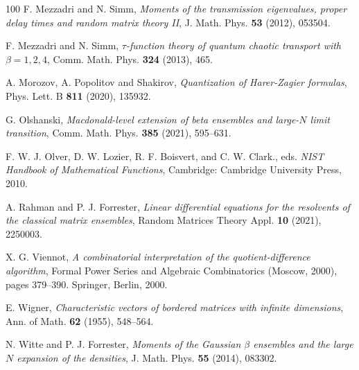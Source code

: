 \documentclass{amsart}
\theoremstyle{plain}
\theoremstyle{remark}
\numberwithin{equation}{section}
\begin{document}
\begin{thebibliography}{100}
 F. Mezzadri and N. Simm, \emph{Moments of the transmission eigenvalues, proper delay times and random matrix theory II}, J. Math. Phys. \textbf{53} (2012), 053504.
 
 F. Mezzadri and N. Simm, \emph{$\tau$-function theory of quantum chaotic transport with $\beta = 1, 2, 4$}, Comm. Math. Phys. \textbf{324} (2013), 465.
 
 A. Morozov, A. Popolitov and Shakirov, \emph{Quantization of Harer-Zagier formulas}, Phys. Lett. B \textbf{811} (2020), 135932. 
 

 G. Olshanski, \emph{Macdonald-level extension of beta ensembles and large-$N$ limit transition}, Comm. Math. Phys. \textbf{385} (2021), 595--631. 

  F. W. J. Olver, D. W. Lozier, R. F. Boisvert, and C. W. Clark., eds. \emph{NIST Handbook of Mathematical Functions}, Cambridge: Cambridge University Press, 2010.
 

 A. Rahman and P. J. Forrester, \emph{Linear differential equations for the resolvents of the classical matrix ensembles}, Random Matrices Theory Appl. \textbf{10} (2021), 2250003.
 

 X. G. Viennot, \emph{A combinatorial interpretation of the quotient-difference algorithm}, Formal Power Series and Algebraic Combinatorics (Moscow, 2000), pages 379--390. Springer, Berlin, 2000.
 

 E. Wigner, \emph{Characteristic vectors of bordered matrices with infinite dimensions}, Ann. of Math. \textbf{62} (1955), 548--564.
 
 N. Witte and P. J. Forrester, \emph{Moments of the Gaussian $\beta$ ensembles and the large $N$ expansion of the densities}, J. Math. Phys. \textbf{55} (2014), 083302. 



 \end{thebibliography}
\end{document}

